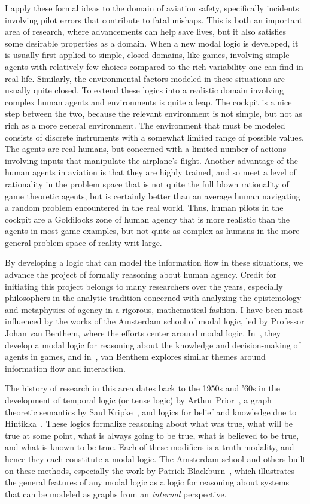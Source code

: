 I apply these formal ideas to the domain of aviation safety, specifically incidents involving pilot errors that contribute to fatal mishaps. This is both an important area of research, where advancements can help save lives, but it also satisfies some desirable properties as a domain. When a new modal logic is developed, it is usually first applied to simple, closed domains, like games, involving simple agents with relatively few choices compared to the rich variability one can find in real life. Similarly, the environmental factors modeled in these situations are usually quite closed. To extend these logics into a realistic domain involving complex human agents and environments is quite a leap. The cockpit is a nice step between the two, because the relevant environment is not simple, but not as rich as a more general environment. The environment that must be modeled consists of discrete instruments with a somewhat limited range of possible values. The agents are real humans, but concerned with a limited number of actions involving inputs that manipulate the airplane's flight. Another advantage of the human agents in aviation is that they are highly trained, and so meet a level of rationality in the problem space that is not quite the full blown rationality of game theoretic agents, but is certainly better than an average human navigating a random problem encountered in the real world. Thus, human pilots in the cockpit are a Goldilocks zone of human agency that is more realistic than the agents in most game examples, but not quite as complex as humans in the more general problem space of reality writ large.

By developing a logic that can model the information flow in these situations, we advance the project of formally reasoning about human agency. Credit for initiating this project belongs to many researchers over the years, especially philosophers in the analytic tradition concerned with analyzing the epistemology and metaphysics of agency in a rigorous, mathematical fashion. I have been most influenced by the works of the Amsterdam school of modal logic, led by Professor Johan van Benthem, where the efforts center around modal logic. In~\cite{VB_TowardPlay}, they develop a modal logic for reasoning about the knowledge and decision-making of agents in games, and in~\cite{VB_LDII}, van Benthem explores similar themes around information flow and interaction. 

The history of research in this area dates back to the 1950s and '60s in the development of temporal logic (or tense logic) by Arthur Prior~\cite{Prior}, a graph theoretic semantics by Saul Kripke~\cite{Kripke}, and logics for belief and knowledge due to Hintikka~\cite{Hintikka}. These logics formalize reasoning about what was true, what will be true at some point, what is always going to be true, what is believed to be true, and what is known to be true. Each of these modifiers is a truth modality, and hence they each constitute a modal logic. The Amsterdam school and others built on these methods, especially the work by Patrick Blackburn~\cite{modal}, which illustrates the general features of any modal logic as a logic for reasoning about systems that can be modeled as graphs from an \emph{internal} perspective. 

